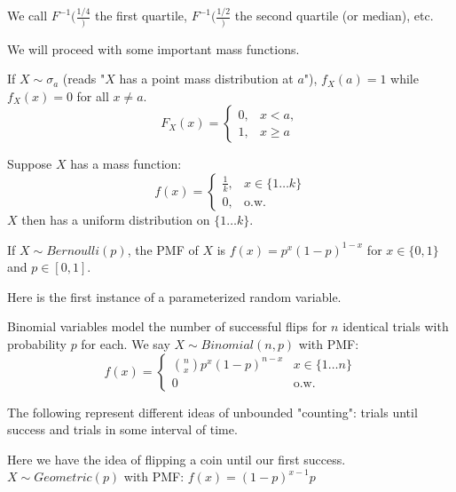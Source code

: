 \documentclass[10pt]{article}
\begin{document}
We call $F^{-1}(\frac{1/4})$ the first quartile, $F^{-1}(\frac{1/2})$ the
second quartile (or median), etc.

We will proceed with some important mass functions.

\begin{definition}
    If $X \sim \sigma_a$ (reads "$X$ has a point mass distribution at $a$"),
    $f_X(a) = 1$ while $f_X(x) = 0$ for all $x \neq a$.
    \[
    F_X(x) =
    \begin{cases}
    0, & x < a, \\
    1, & x \geq a
    \end{cases}
    \]
    \end{definition}

\begin{definition}
    Suppose $X$ has a mass function:
    \[f(x) = 
    \begin{cases}
        \frac{1}{k}, & x \in \{1 \dots k\} \\
        0, & \text{o.w.}
    \end{cases}
    \]
    $X$ then has a uniform distribution on $\{1 \dots k \}$.
\end{definition}

\begin{definition}
    If $X \sim Bernoulli(p)$, the PMF of $X$ is $f(x) = p^x(1-p)^{1-x}$ for $x
    \in \{0, 1\}$ and $p \in [0, 1]$.
\end{definition}

Here is the first instance of a parameterized random variable.

\begin{definition}
    Binomial variables model the number of successful flips for $n$ identical
    trials with probability $p$ for each.
    We say $X \sim Binomial(n, p)$ with PMF:
    \[f(x) = \begin{cases}
        \binom{n}{x}p^x(1-p)^{n-x} & x \in \{1 \dots n\} \\
        0 & \text{o.w.}
    \end{cases}
    \]
\end{definition}

The following represent different ideas of unbounded "counting": trials until
success and trials in some interval of time.

\begin{definition}
    Here we have the idea of flipping a coin until our first success.
    $X \sim Geometric(p)$ with PMF: $f(x) = (1-p)^{x-1}p$
\end{definition}
\end{document}
